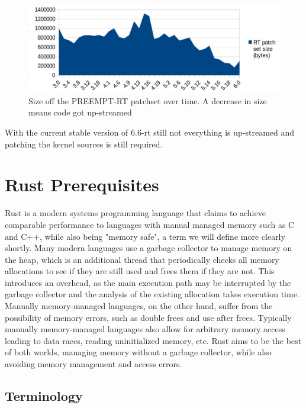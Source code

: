 \begin{figure}[H]
    \begin{center}
        \includegraphics[width=\textwidth]{assets/preempt.jpg}
        \caption{Size off the PREEMPT-RT patchset over time. A decrease in size means code got up-streamed \cite{PreemptSize}}
        \label{fig:preempt}
    \end{center}
\end{figure}

With the current stable version of 6.6-rt still not everything is up-streamed and patching the kernel sources is still required.

\section{Rust Prerequisites}
\label{sec:background:rust}

Rust is a modern systems programming language
that claims to achieve comparable performance to languages with manual managed memory such as C and C++,
while also being "memory safe", a term we will define more clearly shortly.
Many modern languages use a garbage collector to manage memory on the heap,
which is an additional thread that periodically checks all memory allocations to see if they are still used and frees them if they are not.
This introduces an overhead, as the main execution path may be interrupted by the garbage collector and the analysis of the existing allocation takes execution time.
Manually memory-managed languages, on the other hand, suffer from the possibility of memory errors, such as double frees and use after frees.
Typically manually memory-managed languages also allow for arbitrary memory access leading to data races, reading uninitialized memory, etc.
Rust aims to be the best of both worlds, managing memory without a garbage collector, while also avoiding memory management and access errors.

\subsection{Terminology}
\label{sec:background:terminology}

